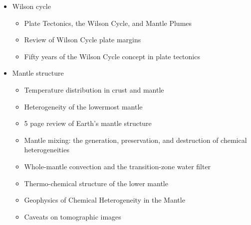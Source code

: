 \begin{itemize}
\item Wilson cycle
   \begin{itemize}
   \item [\twothousandeleven] Plate Tectonics, the Wilson Cycle, and Mantle Plumes \cite{burk11}
   \item [\twothousandfourteen] Review of Wilson Cycle plate margins \cite{buto14}
   \item [\twothousandnineteen] Fifty years of the Wilson Cycle concept in plate tectonics \cite{wihb19}
   \end{itemize}

\item Mantle structure
   \begin{itemize}
   \item [\nineteeneightysix] Temperature distribution in crust and mantle \cite{jemo86}
   \item [\twothousand] Heterogeneity of the lowermost mantle \cite{garn00}
   \item [\twothousandone] 5 page review of Earth's mantle structure \cite{hewo01}
   \item [\twothousandtwo] Mantle mixing: the generation, preservation, and destruction of chemical heterogeneities \cite{vahb02}
   \item [\twothousandthree] Whole-mantle convection and the transition-zone water filter \cite{beka03}
   \item [\twothousandseven] Thermo-chemical structure of the lower mantle \cite{dett07}
   \item [\twothousandtwelve] Geophysics of Chemical Heterogeneity in the Mantle \cite{stli12}
   \item [\twothousandthirteen] Caveats on tomographic images \cite{fopa13}
   \end{itemize}


\end{itemize}
